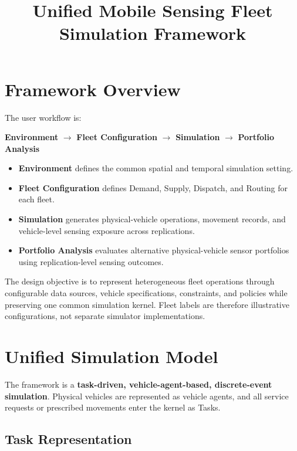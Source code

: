 \documentclass[11pt,a4paper]{article}
\title{\textbf{Unified Mobile Sensing Fleet Simulation Framework}}
\author{}
\date{}
\begin{document}
\maketitle
\vspace{-3.5em}

\section{Framework Overview}

The user workflow is:

\begin{center}
\textbf{Environment} $\longrightarrow$ \textbf{Fleet Configuration}
$\longrightarrow$ \textbf{Simulation} $\longrightarrow$ \textbf{Portfolio Analysis}
\end{center}

\begin{itemize}
  \item \textbf{Environment} defines the common spatial and temporal simulation setting.
  \item \textbf{Fleet Configuration} defines Demand, Supply, Dispatch, and Routing for each fleet.
  \item \textbf{Simulation} generates physical-vehicle operations, movement records, and vehicle-level sensing exposure across replications.
  \item \textbf{Portfolio Analysis} evaluates alternative physical-vehicle sensor portfolios using replication-level sensing outcomes.
\end{itemize}

The design objective is to represent heterogeneous fleet operations through configurable data sources, vehicle specifications, constraints, and policies while preserving one common simulation kernel. Fleet labels are therefore illustrative configurations, not separate simulator implementations.

\section{Unified Simulation Model}

The framework is a \textbf{task-driven, vehicle-agent-based, discrete-event simulation}. Physical vehicles are represented as vehicle agents, and all service requests or prescribed movements enter the kernel as Tasks.

\subsection{Task Representation}
\end{document}
